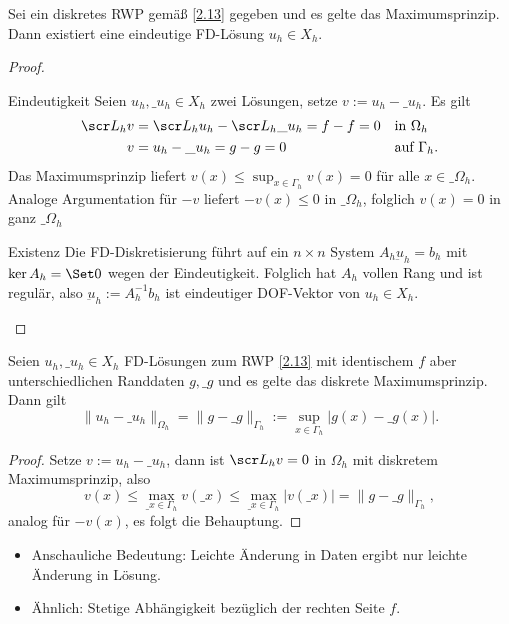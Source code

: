 \begin{kor} \label{2.19}
	Sei ein diskretes RWP gemäß \ref{2.13} gegeben und es gelte das Maximumsprinzip.
	Dann existiert eine eindeutige FD-Lösung $u_h \in X_h$.
	\begin{proof}
		\begin{seg}{Eindeutigkeit}
			Seien $u_h, \_u_h \in X_h$ zwei Lösungen, setze $v := u_h - \_u_h$.
			Es gilt
			\begin{align*}
				\scr L_h v &= \scr L_h u_h - \scr L_h \_u_h = f - f = 0 && \text{in $\Omega_h$} \\
				v &= u_h - \_u_h = g - g = 0 && \text{auf $\Gamma_h$}.
			\end{align*}
			Das Maximumsprinzip liefert $v(x) \le \sup_{x\in\Gamma_h} v(x) = 0$ für alle $x \in \_\Omega_h$.
			Analoge Argumentation für $-v$ liefert $-v(x) \le 0$ in $\_\Omega_h$, folglich $v(x) = 0$ in ganz $\_\Omega_h$
		\end{seg}
		\begin{seg}{Existenz}
			Die FD-Diskretisierung führt auf ein $n \times n$ System $A_h \underbar{u}_h = b_h$ mit $\ker A_h = \Set 0$ wegen der Eindeutigkeit.
			Folglich hat $A_h$ vollen Rang und ist regulär, also $\underbar{u}_h := A_h^{-1} b_h$ ist eindeutiger DOF-Vektor von $u_h \in X_h$.
		\end{seg}
	\end{proof}
\end{kor}

\begin{kor} \label{2.20}
	Seien $u_h, \_u_h \in X_h$ FD-Lösungen zum RWP \ref{2.13} mit identischem $f$ aber unterschiedlichen Randdaten $g, \_g$ und es gelte das diskrete Maximumsprinzip.
	Dann gilt
	\[
		\|u_h - \_u_h\|_{\Omega_h} = \|g-\_g\|_{\Gamma_h} := \sup_{x\in\Gamma_h} |g(x) - \_g(x)|.
	\]
	\begin{proof}
		Setze $v := u_h - \_u_h$, dann ist $\scr L_h v = 0$ in $\Omega_h$ mit diskretem Maximumsprinzip, also
		\[
			v(x) \le \max_{\_x \in \Gamma_h} v(\_x)
			\le \max_{\_x \in \Gamma_h} |v(\_x)|
			= \|g - \_g\|_{\Gamma_h},
		\]
		analog für $-v(x)$, es folgt die Behauptung.
	\end{proof}
	\begin{note}
		\begin{itemize}
			\item
				Anschauliche Bedeutung: Leichte Änderung in Daten ergibt nur leichte Änderung in Lösung.
			\item
				Ähnlich: Stetige Abhängigkeit bezüglich der rechten Seite $f$.
		\end{itemize}
	\end{note}
\end{kor}

